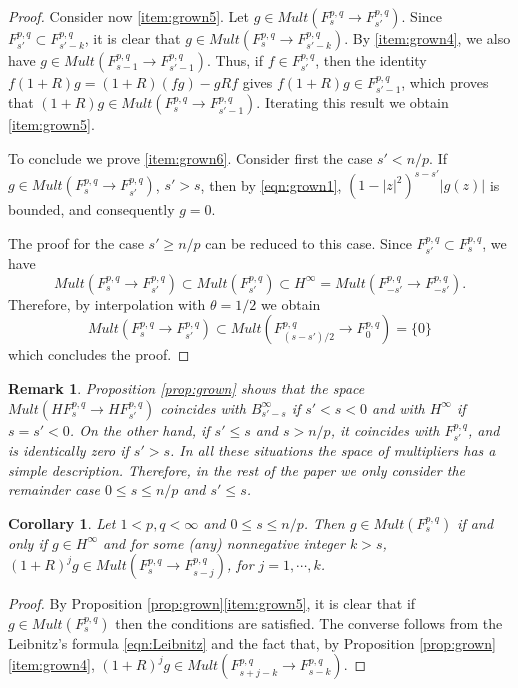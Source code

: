 \documentclass[12pt,twoside,leqno,final]{amsart}
\theoremstyle{plain}
\newtheorem{cor}[thm]{Corollary}
\newtheorem{rem}[thm]{Remark}
\begin{document}
\begin{proof}
Consider now \eqref{item:grown5}. Let  $g\in Mult(F^{p,q}_s\to F^{p,q}_{s'})$. 
Since $F^{p,q}_{s'}\subset F^{p,q}_{s'-k}$, it is clear that $g\in Mult(F^{p,q}_s\to F^{p,q}_{s'-k})$.
By \eqref{item:grown4}, we also have  
$g\in  Mult(F^{p,q}_{s-1}\to F^{p,q}_{s'-1})$. Thus,
if $f\in F^{p,q}_{s'}$, then the identity $f(1+R)g=(1+R)(fg)-gRf$ gives 
 $f(1+R)g\in F^{p,q}_{s'-1}$, which proves that  
 $(1+R)g\in Mult(F^{p,q}_{s}\to F^{p,q}_{s'-1})$. Iterating this result we obtain \eqref{item:grown5}.  

To conclude we prove \eqref{item:grown6}. Consider first the case $s'<n/p$. If 
$g\in Mult(F^{p,q}_s\to F^{p,q}_{s'})$, $s'>s$, then by \eqref{eqn:grown1}, 
$(1-|z|^2)^{s-s'}|g(z)|$ is bounded, and consequently $g=0$. 
 
The proof for the case $s'\geq n/p$ can be reduced to this case. Since $F^{p,q}_{s'}\subset F^{p,q}_s$, we have 
$$
Mult(F^{p,q}_s\to F^{p,q}_{s'})\subset Mult(F^{p,q}_{s'})\subset H^\infty=Mult(F^{p,q}_{-s'}\to F^{p,q}_{-s'}).
$$
Therefore, by interpolation with $\theta=1/2$ we obtain 
$$
Mult(F^{p,q}_s\to F^{p,q}_{s'})\subset Mult(F^{p,q}_{(s-s')/2}\to F^{p,q}_{0})=\{0\}
$$
which concludes the proof.
\end{proof}

\begin{rem}
Proposition \ref{prop:grown} shows that the space 
$Mult(HF^{p,q}_s\to HF^{p,q}_{s'})$  coincides with $B_{s'-s}^\infty$ if $s'<s<0$ and with $H^\infty$ if $s=s'<0$. On the other hand, if $s'\leq s$  and $s>n/p$,  it coincides with $F_{s'}^{p,q}$,  and is identically zero if $s'>s$.
In all these situations the space of multipliers has a simple description. 
Therefore, in the rest of the paper we only consider the remainder case  $0\le s\le n/p$ and $s'\le s$.
\end{rem}

\begin{cor}\label{cor:charMFs}
Let $1<p,q<\infty$ and $0\le s\le n/p$. Then $g\in Mult(F^{p,q}_s)$ if and only if 
$g\in H^\infty$ and for some (any) nonnegative integer $k>s$,  
$(1+R)^j g\in Mult(F^{p,q}_{s}\to F^{p,q}_{s-j})$, for $j=1,\cdots,k$.
\end{cor}

\begin{proof}
By Proposition \ref{prop:grown}\eqref{item:grown5}, it is clear that if $g\in Mult(F^{p,q}_s)$ then the conditions are satisfied. The converse follows from the Leibnitz's formula \eqref{eqn:Leibnitz} 
and the fact that, by Proposition \ref{prop:grown}\eqref{item:grown4}, 
$(1+R)^j g\in Mult(F^{p,q}_{s+j-k}\to F^{p,q}_{s-k})$.
\end{proof}
\end{document}
